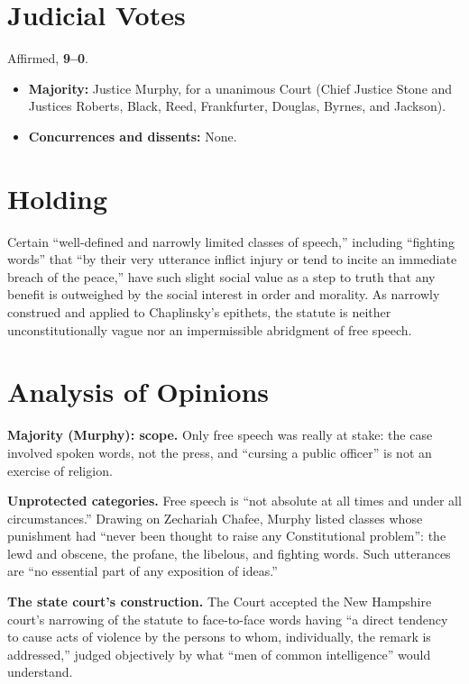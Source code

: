 \documentclass[12pt]{article}
\begin{document}
\section{Judicial Votes}

Affirmed, \textbf{9--0}.
\begin{itemize}
\item \textbf{Majority:} Justice Murphy, for a unanimous Court (Chief Justice Stone and Justices Roberts, Black, Reed, Frankfurter, Douglas, Byrnes, and Jackson).
\item \textbf{Concurrences and dissents:} None.
\end{itemize}

\section{Holding}

Certain ``well-defined and narrowly limited classes of speech,'' including ``fighting words'' that ``by their very utterance inflict injury or tend to incite an immediate breach of the peace,'' have such slight social value as a step to truth that any benefit is outweighed by the social interest in order and morality. As narrowly construed and applied to Chaplinsky's epithets, the statute is neither unconstitutionally vague nor an impermissible abridgment of free speech.

\section{Analysis of Opinions}

\textbf{Majority (Murphy): scope.} Only free speech was really at stake: the case involved spoken words, not the press, and ``cursing a public officer'' is not an exercise of religion.

\textbf{Unprotected categories.} Free speech is ``not absolute at all times and under all circumstances.'' Drawing on Zechariah Chafee, Murphy listed classes whose punishment had ``never been thought to raise any Constitutional problem'': the lewd and obscene, the profane, the libelous, and fighting words. Such utterances are ``no essential part of any exposition of ideas.''

\textbf{The state court's construction.} The Court accepted the New Hampshire court's narrowing of the statute to face-to-face words having ``a direct tendency to cause acts of violence by the persons to whom, individually, the remark is addressed,'' judged objectively by what ``men of common intelligence'' would understand.
\end{document}
